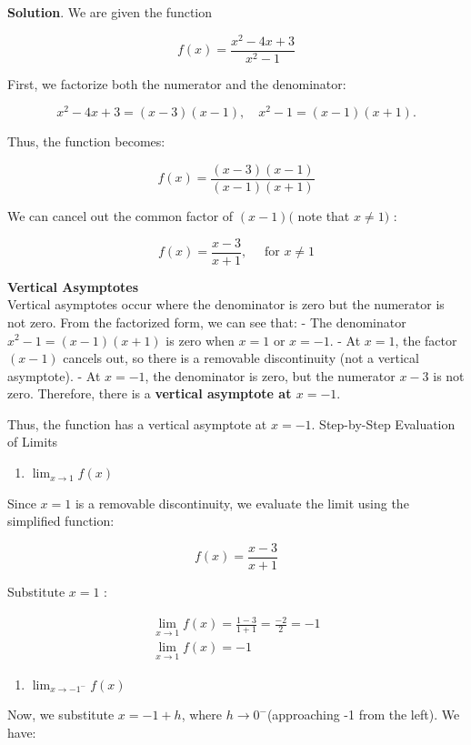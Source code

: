 \documentclass[
]{book}
\providecommand{\tightlist}{%
  \setlength{\itemsep}{0pt}\setlength{\parskip}{0pt}}
\theoremstyle{definition}
\theoremstyle{definition}
\theoremstyle{definition}
\theoremstyle{definition}
\theoremstyle{remark}
\begin{document}
\textbf{Solution}. We are given the function

\[
f(x)=\frac{x^{2}-4 x+3}{x^{2}-1}
\]

First, we factorize both the numerator and the denominator:

\[
x^{2}-4 x+3=(x-3)(x-1), \quad x^{2}-1=(x-1)(x+1) .
\]

Thus, the function becomes:

\[
f(x)=\frac{(x-3)(x-1)}{(x-1)(x+1)}
\]

We can cancel out the common factor of \((x-1)(\) note that \(x \neq 1)\) :

\[
f(x)=\frac{x-3}{x+1}, \quad \text { for } x \neq 1
\]

\textbf{Vertical Asymptotes}\\
Vertical asymptotes occur where the denominator is zero but the numerator is not zero. From the factorized form, we can see that: - The denominator \(x^{2}-1=(x-1)(x+1)\) is zero when \(x=1\) or \(x=-1\). - At \(x=1\), the factor \((x-1)\) cancels out, so there is a removable discontinuity (not a vertical asymptote). - At \(x=-1\), the denominator is zero, but the numerator \(x-3\) is not zero. Therefore, there is a \textbf{vertical asymptote at \(x=-1\)}.

Thus, the function has a vertical asymptote at \(x=-1\).
Step-by-Step Evaluation of Limits

\begin{enumerate}
\def\labelenumi{(\alph{enumi})}
\tightlist
\item
  \(\lim _{x \rightarrow 1} f(x)\)
\end{enumerate}

Since \(x=1\) is a removable discontinuity, we evaluate the limit using the simplified function:

\[
f(x)=\frac{x-3}{x+1}
\]

Substitute \(x=1\) :

\[
\begin{gathered}
\lim _{x \rightarrow 1} f(x)=\frac{1-3}{1+1}=\frac{-2}{2}=-1 \\
\lim _{x \rightarrow 1} f(x)=-1
\end{gathered}
\]

\begin{enumerate}
\def\labelenumi{(\alph{enumi})}
\setcounter{enumi}{1}
\tightlist
\item
  \(\lim _{x \rightarrow-1^{-}} f(x)\)
\end{enumerate}

Now, we substitute \(x=-1+h\), where \(h \rightarrow 0^{-}\)(approaching -1 from the left). We have:
\end{document}
